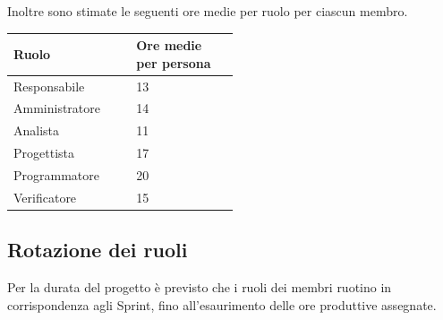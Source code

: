 \documentclass[a4paper,12pt]{article}
\begin{document}
Inoltre sono stimate le seguenti ore medie per ruolo per ciascun membro.
\space
\begin{center}
    \small
    \renewcommand{\arraystretch}{1.2}
    \begin{tabular}{|p{0.20\linewidth}|p{0.30\linewidth}|}
        \hline
        \rowcolor{gray!60}
        \textbf{Ruolo} & \textbf{Ore medie per persona}\\
        \hline
        \rowcolor{white}
        Responsabile & 13 \\
        \hline
        \rowcolor{gray!20}
        Amministratore & 14 \\
        \hline
        \rowcolor{white}
        Analista & 11 \\
        \hline
        \rowcolor{gray!20}
        Progettista & 17 \\
        \hline
        \rowcolor{white}
        Programmatore & 20 \\
        \hline
        \rowcolor{gray!20}
        Verificatore & 15 \\
        \hline
    \end{tabular}
\end{center}

\subsection{Rotazione dei ruoli}
Per la durata del progetto è previsto che i ruoli dei membri ruotino in corrispondenza agli Sprint, fino all'esaurimento delle ore produttive assegnate. 

\end{document}
